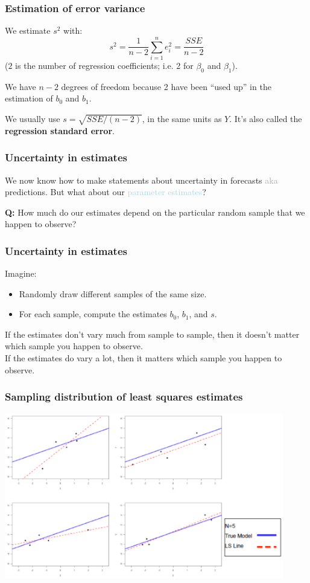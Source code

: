 \documentclass{beamer}
\newcommand{\bo}[1]{\textcolor{burntorange}{#1}}
\newcommand{\lb}[1]{\textcolor{lightblue}{#1}}
\newcommand{\dg}[1]{\textcolor{darkgray}{#1}}
\newcommand{\bl}{\color{lightblue}}
\newcommand{\rd}{\color{burntorange}}
\newcommand{\bk}{\color{black}}
\newcommand{\bi}{\begin{itemize}}
\newcommand{\ib}{\end{itemize}}
\newcommand{\p}{\item}
\newcommand{\sk}{\vspace{.5cm}}
\begin{document}
\begin{frame}
\frametitle{Estimation of error variance} 
\vspace{-0.5cm}

We estimate $s^2$ with: {\color{blue}
\[
s^2 = \frac{1}{n-2} \sum_{i=1}^n e_i^2 = \frac{SSE}{n-2}
\]}
(\rd$2$ \bk is the number of regression coefficients; i.e. \rd 2 \bk for  $\beta_0$ and
$\beta_1$).

\sk
We have $n-2$ degrees of freedom because 2 have been ``used up'' in
the estimation of $b_0$ and $b_1$.

\sk
We usually  use \rd$s = \sqrt{SSE/(n-2)}$\bk, in the same units as $Y$. It's also called the {\color{burntorange} \bf regression standard error}.

\end{frame}

\begin{frame}
	\frametitle{Uncertainty in estimates}
	We now know how to make statements about \bo{uncertainty} in forecasts \dg{aka} predictions.  But what about our \lb{parameter estimates}?
	
	\sk\sk
	
	{\bf Q:} How much do our estimates depend on the 
particular random sample that we happen to observe?
\end{frame}

\begin{frame}
	\frametitle{Uncertainty in estimates}

Imagine:\sk
\bi
\p Randomly draw different samples
of the same size. 
\p For each sample, compute
the estimates $b_0$, $b_1$, and $s$.
\ib

\sk\sk\bl
If the estimates don't vary much 
from sample to sample, then
it doesn't matter which sample you happen
to observe. \rd\\ \sk
If the estimates do vary a lot,
then it matters which sample you happen
to observe.

\end{frame}


\begin{frame}
\frametitle{Sampling distribution of least squares estimates} 


\hspace*{-7mm}\includegraphics[width=4.8in]{figures/sampling1}

\end{frame}
\end{document}
